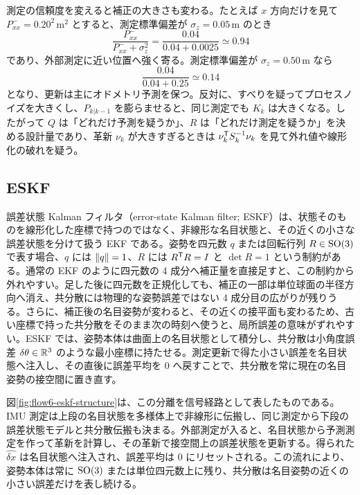 \begin{example}
測定の信頼度を変えると補正の大きさも変わる。たとえば $x$ 方向だけを見て $P^-_{xx}=0.20^2\,\mathrm{m}^2$ とすると、測定標準偏差が $\sigma_z=0.05\,\mathrm{m}$ のとき
\begin{equation}
  \frac{P^-_{xx}}{P^-_{xx}+\sigma_z^2}
  =
  \frac{0.04}{0.04+0.0025}
  \simeq0.94
\end{equation}
であり、外部測定に近い位置へ強く寄る。測定標準偏差が $\sigma_z=0.50\,\mathrm{m}$ なら
\begin{equation}
  \frac{0.04}{0.04+0.25}
  \simeq0.14
\end{equation}
となり、更新は主にオドメトリ予測を保つ。反対に、すべりを疑ってプロセスノイズを大きくし、$P_{k|k-1}$ を膨らませると、同じ測定でも $K_k$ は大きくなる。したがって $Q$ は「どれだけ予測を疑うか」、$R$ は「どれだけ測定を疑うか」を決める設計量であり、革新 $\nu_k$ が大きすぎるときは $\nu_k^{\mathsf{T}} S_k^{-1}\nu_k$ を見て外れ値や線形化の破れを疑う。
\end{example}

\subsection{ESKF}

誤差状態 Kalman フィルタ（error-state Kalman filter; ESKF）は、状態そのものを線形化した座標で持つのではなく、非線形な名目状態と、その近くの小さな誤差状態を分けて扱う EKF である。姿勢を四元数 $q$ または回転行列 $R\in\operatorname{SO}(3)$ で表す場合、$q$ には $\left\|q\right\|=1$、$R$ には $R^{\mathsf{T}} R=I$ と $\det R=1$ という制約がある。通常の EKF のように四元数の 4 成分へ補正量を直接足すと、この制約から外れやすい。足した後に四元数を正規化しても、補正の一部は単位球面の半径方向へ消え、共分散には物理的な姿勢誤差ではない 4 成分目の広がりが残りうる。さらに、補正後の名目姿勢が変わると、その近くの接平面も変わるため、古い座標で持った共分散をそのまま次の時刻へ使うと、局所誤差の意味がずれやすい。ESKF では、姿勢本体は曲面上の名目状態として積分し、共分散は小角度誤差 $\delta\theta\in\mathbb{R}^3$ のような最小座標に持たせる。測定更新で得た小さい誤差を名目状態へ注入し、その直後に誤差平均を 0 へ戻すことで、共分散を常に現在の名目姿勢の接空間に置き直す。

図\ref{fig:flow6-eskf-structure}は、この分離を信号経路として表したものである。IMU 測定は上段の名目状態を多様体上で非線形に伝搬し、同じ測定から下段の誤差状態モデルと共分散伝搬も決まる。外部測定が入ると、名目状態から予測測定を作って革新を計算し、その革新で接空間上の誤差状態を更新する。得られた $\widehat{\delta x}$ は名目状態へ注入され、誤差平均は 0 にリセットされる。この流れにより、姿勢本体は常に $\operatorname{SO}(3)$ または単位四元数上に残り、共分散は名目姿勢の近くの小さい誤差だけを表し続ける。

